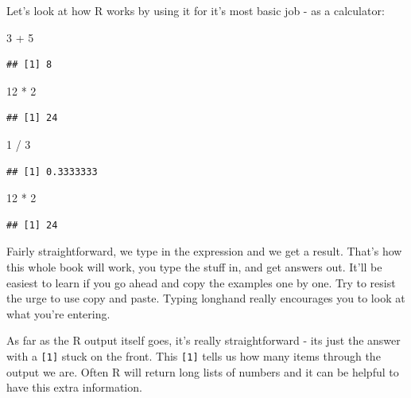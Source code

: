 \documentclass[
]{book}
\newenvironment{Shaded}{\begin{snugshade}}{\end{snugshade}}
\newcommand{\DecValTok}[1]{\textcolor[rgb]{0.00,0.00,0.81}{#1}}
\newcommand{\SpecialCharTok}[1]{\textcolor[rgb]{0.00,0.00,0.00}{#1}}
\begin{document}
Let's look at how R works by using it for it's most basic job - as a calculator:

\begin{Shaded}
\begin{Highlighting}[]
 \DecValTok{3} \SpecialCharTok{+} \DecValTok{5}
\end{Highlighting}
\end{Shaded}

\begin{verbatim}
## [1] 8
\end{verbatim}

\begin{Shaded}
\begin{Highlighting}[]
 \DecValTok{12} \SpecialCharTok{*} \DecValTok{2}
\end{Highlighting}
\end{Shaded}

\begin{verbatim}
## [1] 24
\end{verbatim}

\begin{Shaded}
\begin{Highlighting}[]
 \DecValTok{1} \SpecialCharTok{/} \DecValTok{3}
\end{Highlighting}
\end{Shaded}

\begin{verbatim}
## [1] 0.3333333
\end{verbatim}

\begin{Shaded}
\begin{Highlighting}[]
 \DecValTok{12} \SpecialCharTok{*} \DecValTok{2}
\end{Highlighting}
\end{Shaded}

\begin{verbatim}
## [1] 24
\end{verbatim}

Fairly straightforward, we type in the expression and we get a result. That's how this whole book will work, you type the stuff in, and get answers out. It'll be easiest to learn if you go ahead and copy the examples one by one. Try to resist the urge to use copy and paste. Typing longhand really encourages you to look at what you're entering.

As far as the R output itself goes, it's really straightforward - its just the answer with a \texttt{{[}1{]}} stuck on the front. This \texttt{{[}1{]}} tells us how many items through the output we are. Often R will return long lists of numbers and it can be helpful to have this extra information.
\end{document}
